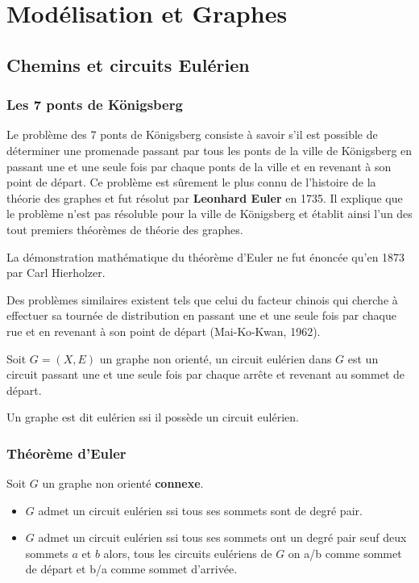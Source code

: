 \section{Modélisation et Graphes}

\subsection{Chemins et circuits Eulérien}

\subsubsection{Les 7 ponts de Königsberg}

Le problème des 7 ponts de Königsberg consiste à savoir s'il est possible de déterminer une promenade passant par tous les 
ponts de la ville de Königsberg en passant une et une seule fois par chaque ponts de la ville et en revenant à son point de départ. 
Ce problème est sûrement le plus connu de l'histoire de la théorie des graphes et fut résolut par \textbf{Leonhard Euler} en 1735. 
Il explique que le problème n'est pas résoluble pour la ville de Königsberg et établit ainsi l'un des tout premiers théorèmes 
de théorie des graphes. 

La démonstration mathématique du théorème d'Euler ne fut énoncée qu'en 1873 par Carl Hierholzer. 

Des problèmes similaires existent tels que celui du facteur chinois qui cherche à effectuer sa tournée de distribution en 
passant une et une seule fois par chaque rue et en revenant à son point de départ (Mai-Ko-Kwan, 1962).


\begin{definition}
    Soit $G = (X,E)$ un graphe non orienté, un circuit eulérien dans $G$ est un circuit passant une et une seule 
    fois par chaque arrête et revenant au sommet de départ. 

    Un graphe est dit eulérien ssi il possède un circuit eulérien. 
\end{definition}

\subsubsection{Théorème d'Euler}

\begin{theorem}
    Soit $G$ un graphe non orienté \textbf{connexe}. 
    \begin{itemize}
        \item $G$ admet un circuit eulérien ssi tous ses sommets sont de degré pair. 
        \item $G$ admet un circuit eulérien ssi tous ses sommets ont un degré pair seuf deux sommets $a$ et $b$
        alors, tous les circuits eulériens de $G$ on a/b comme sommet de départ et b/a comme sommet d'arrivée.  
    \end{itemize}
\end{theorem}

